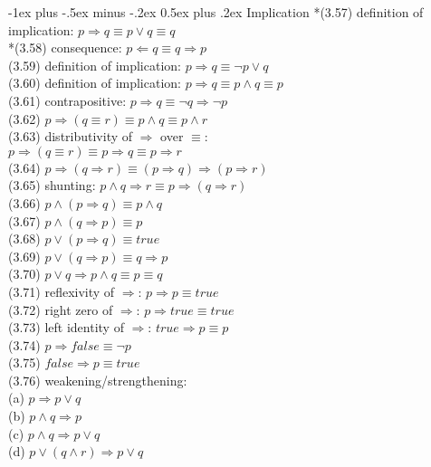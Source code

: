 \documentclass[10pt,landscape]{article}
\makeatletter
\renewcommand{\subsection}{\@startsection{subsection}{2}{0mm}%
                                {-1ex plus -.5ex minus -.2ex}%
                                {0.5ex plus .2ex}%
                                {\normalfont\small\bfseries}}
\makeatother
\begin{document}
\begin{multicols}{3}
{\subsection{Implication}
*(3.57) definition of implication: $p\Rightarrow q\equiv p\lor q\equiv q$\\
*(3.58) consequence: $p\Leftarrow q\equiv q\Rightarrow p$\\
(3.59) definition of implication: $p\Rightarrow q\equiv \neg p\lor q$\\
(3.60) definition of implication: $p\Rightarrow q\equiv p\land q\equiv p$\\
(3.61) contrapositive: $p\Rightarrow q\equiv \neg q\Rightarrow \neg p$\\
(3.62) $p\Rightarrow (q\equiv r)\equiv p\land q\equiv p\land r$\\
(3.63) distributivity of $\Rightarrow$ over $\equiv$:\\
\qquad$p\Rightarrow (q\equiv r)\equiv p\Rightarrow q\equiv p\Rightarrow r$\\
(3.64) $p\Rightarrow (q\Rightarrow r)\equiv (p\Rightarrow q)\Rightarrow (p\Rightarrow r)$\\
(3.65) shunting: $p\land q\Rightarrow r\equiv p\Rightarrow(q\Rightarrow r)$\\
(3.66) $p\land (p\Rightarrow q)\equiv p\land q$\\
(3.67) $p\land (q\Rightarrow p)\equiv p$\\
(3.68) $p\lor (p\Rightarrow q)\equiv true$\\
(3.69) $p\lor (q\Rightarrow p)\equiv q\Rightarrow p$\\
(3.70) $p\lor q\Rightarrow p\land q\equiv p\equiv q$\\
(3.71) reflexivity of $\Rightarrow$: $p\Rightarrow p \equiv true$\\
(3.72) right zero of $\Rightarrow$: $p\Rightarrow true \equiv true$\\
(3.73) left identity of $\Rightarrow$: $true\Rightarrow p\equiv p$\\
(3.74) $p\Rightarrow false\equiv \neg p$\\
(3.75) $false\Rightarrow p\equiv true$\\
(3.76) weakening/strengthening:\\
\qquad(a) $p\Rightarrow p\lor q$\\
\qquad(b) $p\land q\Rightarrow p$\\
\qquad(c) $p\land q\Rightarrow p\lor q$\\
\qquad(d) $p\lor (q\land r)\Rightarrow p\lor q$\\
}
\end{multicols}
\end{document}
